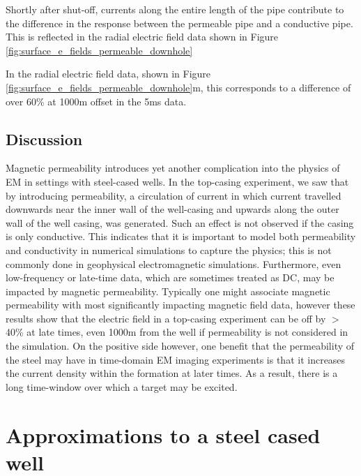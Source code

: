 




Shortly after shut-off, currents along the entire length of the pipe contribute to the difference in the response between the permeable pipe and a conductive pipe. This is reflected in the radial electric field data shown in Figure \ref{fig:surface_e_fields_permeable_downhole}

In the radial electric field data, shown in Figure \ref{fig:surface_e_fields_permeable_downhole}m, this corresponds to a difference of over 60\% at 1000m offset in the 5ms data.





\subsection{Discussion}
Magnetic permeability introduces yet another complication into the physics of EM in settings with steel-cased wells. In the top-casing experiment, we saw that by introducing permeability, a circulation of current in which current travelled downwards near the inner wall of the well-casing and upwards along the outer wall of the well casing, was generated. Such an effect is not observed if the casing is only conductive. This indicates that it is important to model both permeability and conductivity in numerical simulations to capture the physics; this is not commonly done in geophysical electromagnetic simulations. Furthermore, even low-frequency or late-time data, which are sometimes treated as DC, may be impacted by magnetic permeability. Typically one might associate magnetic permeability with most significantly impacting magnetic field data, however these results show that the electric field in a top-casing experiment can be off by $>$40\% at late times, even 1000m from the well if permeability is not considered in the simulation. On the positive side however, one  benefit that the permeability of the steel may have in time-domain EM imaging experiments is that it increases the current density within the formation at later times. As a result, there is a long time-window over which a target may be excited.
\section{Approximations to a steel cased well}
\label{sec:approximating-em}

